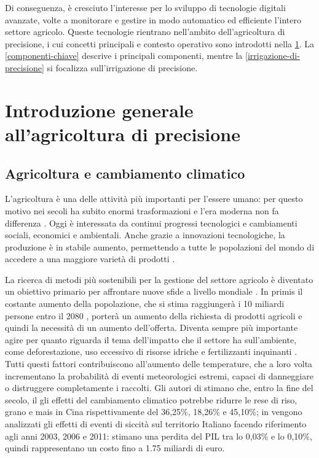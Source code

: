 \documentclass[12pt,a4paper,openright,twoside, openany]{book}
\begin{document}
Di conseguenza, è cresciuto l'interesse per lo sviluppo di tecnologie digitali avanzate, volte a monitorare e gestire in modo automatico ed efficiente l'intero settore agricolo. Queste tecnologie rientrano nell'ambito dell'agricoltura di precisione, i cui concetti principali e contesto operativo sono introdotti nella \cref{introduzione-agricoltura-precisione}. La \cref{componenti-chiave} descrive i principali componenti, mentre la \cref{irrigazione-di-precisione} si focalizza sull'irrigazione di precisione.
\newpage
\section{Introduzione generale all’agricoltura di precisione}\label{introduzione-agricoltura-precisione}

\subsection{Agricoltura e cambiamento climatico}

L'agricoltura è una delle attività più importanti per l'essere umano: per questo motivo nei secoli ha subito enormi trasformazioni e l'era moderna non fa differenza \cite{FEDERICO-FEEDING-2005}. Oggi è interessata da continui progressi tecnologici e cambiamenti sociali, economici e ambientali. Anche grazie a innovazioni tecnologiche, la produzione è in stabile aumento, permettendo a tutte le popolazioni del mondo di accedere a una maggiore varietà di prodotti \cite{FAO-AGRO-STATS-2023}.

La ricerca di metodi più sostenibili per la gestione del settore agricolo è diventato un obiettivo primario per affrontare nuove sfide a livello mondiale \cite{SDG-2-4-1}. In primis il costante aumento della popolazione, che si stima raggiungerà i 10 miliardi persone entro il 2080 \cite{UN-POPULATION-2024}, porterà un aumento della richiesta di prodotti agricoli e quindi la necessità di un aumento dell'offerta. Diventa sempre più importante agire per quanto riguarda il tema dell'impatto che il settore ha sull'ambiente, come deforestazione, uso eccessivo di risorse idriche e fertilizzanti inquinanti \cite{EIOM-2012}.
Tutti questi fattori contribuiscono all'aumento delle temperature, che a loro volta incrementano la probabilità di eventi meteorologici estremi, capaci di danneggiare o distruggere completamente i raccolti. Gli autori di \cite{ZHANG-PENG-2017} stimano che, entro la fine del secolo, il gli effetti del cambiamento climatico potrebbe ridurre le rese di riso, grano e mais in Cina rispettivamente del 36,25\%, 18,26\% e 45,10\%; in \cite{Garcia2021} vengono analizzati gli effetti di eventi di siccità sul territorio Italiano facendo riferimento agli anni 2003, 2006 e 2011: stimano una perdita del PIL tra lo 0,03\% e lo 0,10\%, quindi rappresentano un costo fino a 1.75 miliardi di euro.
\end{document}
